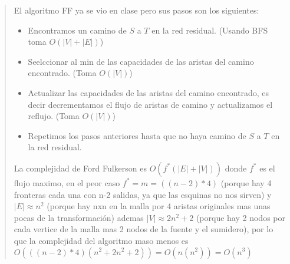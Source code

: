 \begin{quote}
    El algoritmo FF ya se vio en clase pero sus pasos son los siguientes: \vspace{.2cm}
    \begin{itemize}
        \item Encontramos un camino de $S$ a $T$ en la red residual. (Usando BFS toma $O(|V|+|E|)$)
        \item Seelccionar al min de las capacidades de las aristas del camino encontrado. (Toma $O(|V|)$)
        \item Actualizar las capacidades de las aristas del camino encontrado, es decir decrementamos el flujo de aristas de camino y actualizamos el reflujo. (Toma $O(|V|)$)
        \item Repetimos los pasos anteriores hasta que no haya camino de $S$ a $T$ en la red residual. 
    \end{itemize}

    La complejidad de Ford Fulkerson es $O(f^*(|E|+|V|))$ donde $f^*$ es el flujo maximo, en el peor caso $f^* = m = ((n-2)*4)$ (porque hay 4 fronteras cada una con n-2 salidas, ya que las esquinas no nos sirven) y $|E| \approx n^2$ (porque hay nxn en la malla por 4 aristas originales mas unas pocas de la transformación) ademas $|V| \approx 2n^2+2$ (porque hay 2 nodos por cada vertice de la malla mas 2 nodos de la fuente y el sumidero), por lo que la complejidad del algoritmo maso menos es $O(((n-2)*4)(n^2+2n^2+2)) = O(n (n^2)) = O(n^3)$
\end{quote}
\newpage